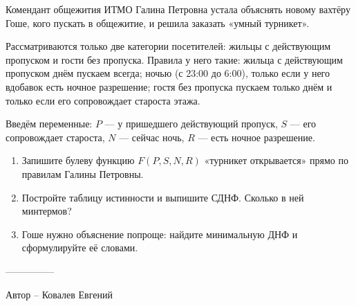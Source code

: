 \question
Комендант общежития ИТМО Галина Петровна устала объяснять новому вахтёру Гоше, кого пускать в общежитие, и решила заказать «умный турникет».

Рассматриваются только две категории посетителей: жильцы с действующим пропуском и гости без пропуска. Правила у него такие: жильца с действующим пропуском днём пускаем всегда; ночью (с 23:00 до 6:00), только если у него вдобавок есть ночное разрешение; гостя без пропуска пускаем только днём и только если его сопровождает староста этажа.

Введём переменные: $P$ — у пришедшего действующий пропуск, $S$ — его сопровождает староста, $N$ — сейчас ночь, $R$ — есть ночное разрешение.

\begin{enumerate}
    \item Запишите булеву функцию $F(P, S, N, R)$ «турникет открывается» прямо по правилам Галины Петровны.
    \item Постройте таблицу истинности и выпишите СДНФ. Сколько в ней минтермов?
    \item Гоше нужно объяснение попроще: найдите минимальную ДНФ и сформулируйте её словами.
\end{enumerate}

---------------

Автор -- Ковалев Евгений